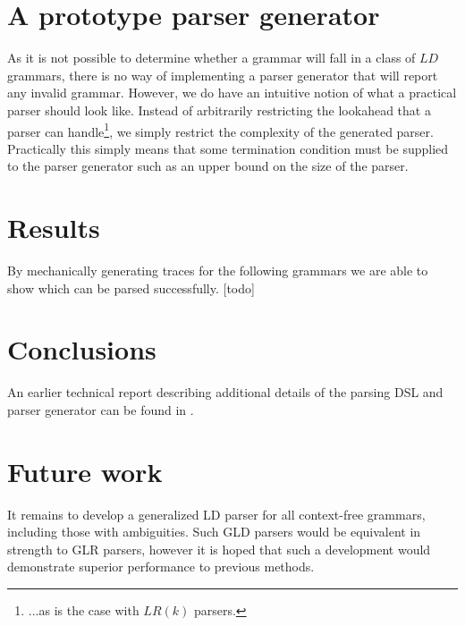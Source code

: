 \documentclass[envcountsame,runningheads]{llncs}
\begin{document}
\section{A prototype parser generator}

As it is not possible to determine whether a grammar will fall in a class of $LD$ grammars,
there is no way of implementing a parser generator that will report any invalid grammar.
However, we do have an intuitive notion of what a practical parser should look like.
Instead of arbitrarily restricting the lookahead that a parser can handle\footnote{...as is the case with $LR(k)$ parsers.},
we simply restrict the complexity of the generated parser.
Practically this simply means that some termination condition must be supplied to the parser generator such as an upper bound on the size of the parser.

\section{Results}

By mechanically generating traces for the following grammars we are able to show which can be parsed successfully. [todo]

\section{Conclusions}
An earlier technical report describing additional details of the parsing DSL and parser generator can be found in \cite{Lin11}.


\section{Future work}

It remains to develop a generalized LD parser for all context-free grammars, including those with ambiguities. 
Such GLD parsers would be equivalent in strength to GLR parsers, however it is hoped that such
a development would demonstrate superior performance to previous methods.



\end{document}
